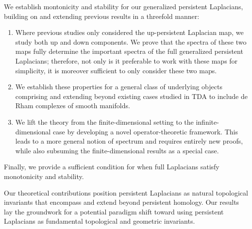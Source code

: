 \documentclass[11pt]{article}
\theoremstyle{definition}
\theoremstyle{remark}
\begin{document}
We establish montonicity and stability for our generalized persistent Laplacians, building on and extending previous results in a threefold manner: 
\begin{enumerate}
\item[(i)] Where previous studies only considered the up-persistent Laplacian map, we study both up and down components.  We prove that the spectra of these two maps fully determine the important spectra of the full generalized persistent Laplacians; therefore, not only is it preferable to work with these maps for simplicity, it is moreover sufficient to only consider these two maps.
\item[(ii)] We establish these properties for a general class of underlying objects comprising and extending beyond existing cases studied in TDA to include de Rham complexes of smooth manifolds.
\item[(iii)] We lift the theory from the finite-dimensional setting to the infinite-dimensional case by developing a novel operator-theoretic framework. This leads to a more general notion of spectrum and requires entirely new proofs, while also subsuming the finite-dimensional results as a special case.
\end{enumerate}

Finally, we provide a sufficient condition for when full Laplacians satisfy monotonicity and stability.

Our theoretical contributions position persistent Laplacians as natural topological invariants that encompass and extend beyond persistent homology. Our results lay the groundwork for a potential paradigm shift toward using persistent Laplacians as fundamental topological and geometric invariants.
\end{document}
